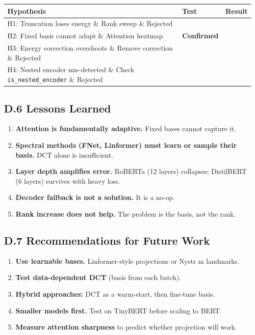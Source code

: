\begin{table}[H]
\centering
\small
\begin{tabular}{lll}
\toprule
\textbf{Hypothesis} & \textbf{Test} & \textbf{Result} \\
\midrule
H1: Truncation loses energy \& Rank sweep \& Rejected \\
H2: Fixed basis cannot adapt \& Attention heatmap & \textbf{Confirmed} \\
H3: Energy correction overshoots \& Remove correction \& Rejected \\
H4: Nested encoder mis-detected \& Check \texttt{is\_nested\_encoder} \& Rejected \\
\bottomrule
\end{tabular}
\end{table}

\subsection{D.6 Lessons Learned}

\begin{enumerate}
\item \textbf{Attention is fundamentally adaptive.} Fixed bases cannot capture it.
\item \textbf{Spectral methods (FNet, Linformer) must learn or sample their basis.}
  DCT alone is insufficient.
\item \textbf{Layer depth amplifies error.} RoBERTa (12 layers) collapses; DistilBERT
  (6 layers) survives with heavy loss.
\item \textbf{Decoder fallback is not a solution.} It is a no-op.
\item \textbf{Rank increase does not help.} The problem is the basis, not the rank.

\end{enumerate}
\subsection{D.7 Recommendations for Future Work}

\begin{enumerate}
\item \textbf{Use learnable bases.} Linformer-style projections or Nystr m landmarks.
\item \textbf{Test data-dependent DCT} (basis from each batch).
\item \textbf{Hybrid approaches:} DCT as a warm-start, then fine-tune basis.
\item \textbf{Smaller models first.} Test on TinyBERT before scaling to BERT.
\item \textbf{Measure attention sharpness} to predict whether projection will work.

\end{enumerate}
